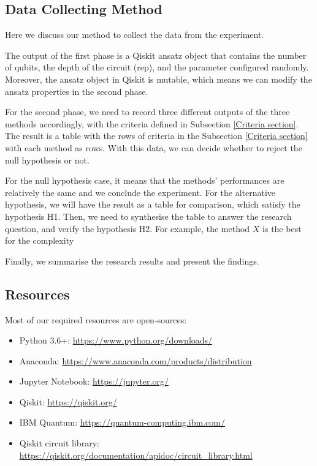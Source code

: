 \subsection{Data Collecting Method}
\label{Data Collecting Section}
Here we discuss our method to collect the data from the experiment.

The output of the first phase is a Qiskit ansatz object that contains the number of qubits, the depth of the circuit (rep), and the parameter configured randomly.
Moreover, the ansatz object in Qiskit is mutable, which means we can modify the ansatz properties in the second phase.

For the second phase, we need to record three different outputs of the three methods accordingly, with the criteria defined in Subsection \ref{Criteria section}.
The result is a table with the rows of criteria in the Subsection \ref{Criteria section} with each method as rows.
With this data, we can decide whether to reject the null hypothesis or not.

For the null hypothesis case, it means that the methods' performances are relatively the same and we conclude the experiment.
For the alternative hypothesis, we will have the result as a table for comparison, which satisfy the hypothesis H1. 
Then, we need to synthesise the table to answer the research question, and verify the hypothesis H2. 
For example, the method $X$ is the best for the complexity

Finally, we summarise the research results and present the findings.

\subsection{Resources}
Most of our required resources are open-sources:
\begin{itemize}
    \item Python 3.6+: \url{https://www.python.org/downloads/}
    \item Anaconda: \url{https://www.anaconda.com/products/distribution}
    \item Jupyter Notebook: \url{https://jupyter.org/}
    \item Qiskit: \url{https://qiskit.org/}
    \item IBM Quantum: \url{https://quantum-computing.ibm.com/}
    \item Qiskit circuit library: \url{https://qiskit.org/documentation/apidoc/circuit_library.html}
\end{itemize}

